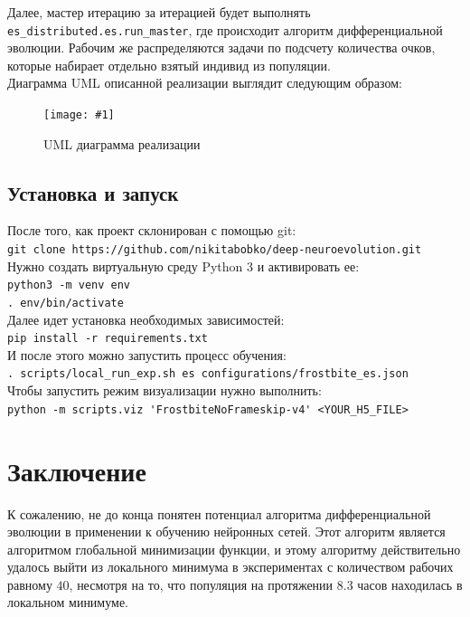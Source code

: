 \documentclass[12pt]{article}
\newcommand{\img}[3]{
    \begin{figure}[H]
        \centering
        \texttt{[image: \#1]}
        \caption{#3}
    \end{figure}
}
\begin{document}
    Далее, мастер итерацию за итерацией будет выполнять \verb!es_distributed.es.run_master!, где происходит алгоритм дифференциальной эволюции. Рабочим же распределяются задачи по подсчету количества очков, которые набирает отдельно взятый индивид из популяции. \\

    Диаграмма UML описанной реализации выглядит следующим образом:
    \img{uml.png}{0.8}{UML диаграмма реализации}

    \subsection{Установка и запуск}
    После того, как проект склонирован с помощью git: \\

    \verb!git clone https://github.com/nikitabobko/deep-neuroevolution.git! \\

    Нужно создать виртуальную среду Python 3 и активировать ее: \\

    \verb!python3 -m venv env! \\
    \verb!. env/bin/activate! \\

    Далее идет установка необходимых зависимостей: \\

    \verb!pip install -r requirements.txt! \\

    И после этого можно запустить процесс обучения: \\

    \verb!. scripts/local_run_exp.sh es configurations/frostbite_es.json! \\

    Чтобы запустить режим визуализации нужно выполнить: \\

    \verb!python -m scripts.viz 'FrostbiteNoFrameskip-v4' <YOUR_H5_FILE>!

\section{Заключение}
    К сожалению, не до конца понятен потенциал алгоритма дифференциальной эволюции в применении к обучению нейронных сетей. Этот алгоритм является алгоритмом глобальной минимизации функции, и этому алгоритму действительно удалось выйти из локального минимума в экспериментах с количеством рабочих равному $40$, несмотря на то, что популяция на протяжении $8.3$ часов находилась в локальном минимуме. \\
\end{document}
